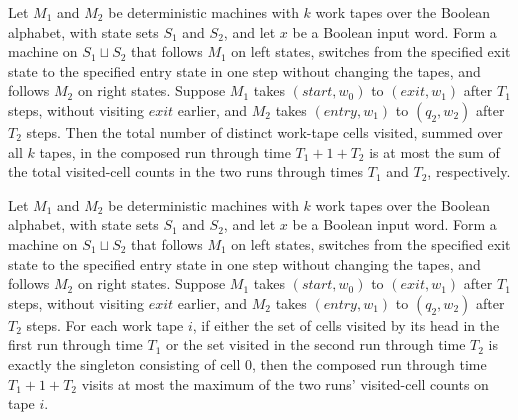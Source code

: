\begin{theorem}
\label{Turing.seamCompTM_spaceUsed_le_add}
\leanok
{}
Let $M_1$ and $M_2$ be deterministic machines with $k$ work tapes over the Boolean
alphabet, with state sets $S_1$ and $S_2$, and let $x$ be a Boolean input word. Form a
machine on $S_1\sqcup S_2$ that follows $M_1$ on left states, switches from the
specified exit state to the specified entry state in one step without changing the
tapes, and follows $M_2$ on right states. Suppose $M_1$ takes $(start,w_0)$ to
$(exit,w_1)$ after $T_1$ steps, without visiting $exit$ earlier, and $M_2$ takes
$(entry,w_1)$ to $(q_2,w_2)$ after $T_2$ steps. Then the total number of distinct
work-tape cells visited, summed over all $k$ tapes, in the composed run through time
$T_1+1+T_2$ is at most the sum of the total visited-cell counts in the two runs through
times $T_1$ and $T_2$, respectively.
\end{theorem}

\begin{theorem}
\label{Turing.seamCompTM_spaceUsedByTape_le_max}
\leanok
{}
Let $M_1$ and $M_2$ be deterministic machines with $k$ work tapes over the Boolean
alphabet, with state sets $S_1$ and $S_2$, and let $x$ be a Boolean input word. Form a
machine on $S_1\sqcup S_2$ that follows $M_1$ on left states, switches from the
specified exit state to the specified entry state in one step without changing the
tapes, and follows $M_2$ on right states. Suppose $M_1$ takes $(start,w_0)$ to
$(exit,w_1)$ after $T_1$ steps, without visiting $exit$ earlier, and $M_2$ takes
$(entry,w_1)$ to $(q_2,w_2)$ after $T_2$ steps. For each work tape $i$, if either the
set of cells visited by its head in the first run through time $T_1$ or the set visited
in the second run through time $T_2$ is exactly the singleton consisting of cell $0$,
then the composed run through time $T_1+1+T_2$ visits at most the maximum of the two
runs' visited-cell counts on tape $i$.
\end{theorem}

